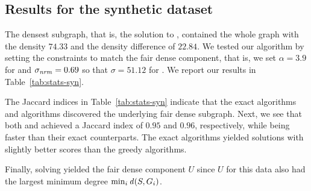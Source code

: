 


\subsection{Results for the synthetic dataset} 
The densest subgraph, that is, the solution to \problemdts, contained the whole graph with the density $74.33$ and the density difference of $22.84$. We tested our algorithm by setting the constraints to match the fair dense component, that is, we set $\alpha = 3.9$ for \problemcdcsm
and $\sigma_{\mathit{nrm}} = 0.69$ so that $\sigma = 51.12$ for \problemcdcsdiff.  We report our results in Table~\ref{tab:stats-syn}.

The Jaccard indices in Table~\ref{tab:stats-syn} indicate that the exact algorithms \algipcm and \algipdiff algorithms discovered the underlying fair dense subgraph.
Next, we see that both \alggrdfms and \alggrd achieved a Jaccard index of $0.95$ and $0.96$, respectively, while being faster than their exact counterparts. The exact algorithms yielded solutions with slightly better scores than the greedy algorithms.

Finally, solving \problemdcs yielded the fair dense component $U$ since $U$ for this data also had the largest minimum degree $\min_i \dens{S, G_i}$.




